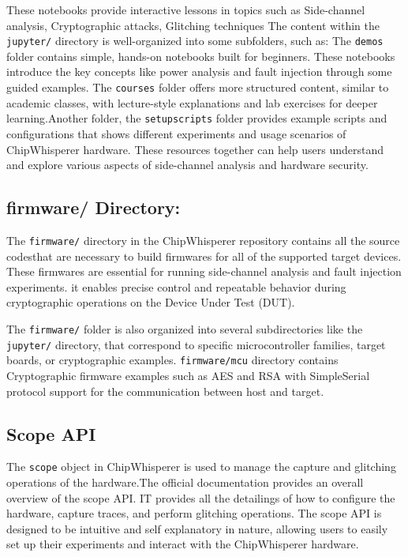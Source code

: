 These notebooks provide interactive lessons in topics such as Side-channel analysis, Cryptographic attacks, Glitching techniques
The content within the \texttt{jupyter/} directory is well-organized into some subfolders, such as:
 The \texttt{demos} folder contains simple, hands-on notebooks built for beginners. These notebooks introduce the key concepts like power analysis and fault injection through some guided examples. The \texttt{courses} folder offers more structured content, similar to academic classes, with lecture-style explanations and lab exercises for deeper learning.Another folder, the \texttt{setupscripts} folder provides example scripts and configurations that shows different experiments and usage scenarios of ChipWhisperer hardware. These resources together can help users understand and explore various aspects of side-channel analysis and hardware security.
\subsection*{firmware/ Directory:}
The \texttt{firmware/} directory in the ChipWhisperer repository contains all the source codesthat are necessary to build firmwares for all of the supported target devices. These firmwares are essential for running side-channel analysis and fault injection experiments. it enables precise control and repeatable behavior during cryptographic operations on the Device Under Test (DUT).

The \texttt{firmware/} folder is also organized into several subdirectories like the \texttt{jupyter/} directory, that correspond to specific microcontroller families, target boards, or cryptographic examples. \texttt{firmware/mcu} directory contains Cryptographic firmware examples such as AES and RSA with SimpleSerial protocol support for the communication between host and target.

\subsection{Scope API}
The \texttt{scope} object in ChipWhisperer is used to manage the capture and glitching operations of the hardware.The official documentation \cite{chipwhisperer_scope_api} provides an overall overview of the scope API. IT provides all the detailings of how to configure the hardware, capture traces, and perform glitching operations. The scope API is designed to be intuitive and self explanatory in nature, allowing users to easily set up their experiments and interact with the ChipWhisperer hardware.

